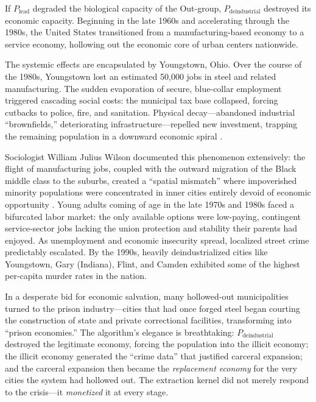 \documentclass[12pt,openany]{book}
\begin{document}
If $P_{\text{lead}}$ degraded the biological capacity of the Out-group, $P_{\text{deindustrial}}$ destroyed its economic capacity. Beginning in the late 1960s and accelerating through the 1980s, the United States transitioned from a manufacturing-based economy to a service economy, hollowing out the economic core of urban centers nationwide.

The systemic effects are encapsulated by Youngstown, Ohio. Over the course of the 1980s, Youngstown lost an estimated 50,000 jobs in steel and related manufacturing. The sudden evaporation of secure, blue-collar employment triggered cascading social costs: the municipal tax base collapsed, forcing cutbacks to police, fire, and sanitation. Physical decay---abandoned industrial ``brownfields,'' deteriorating infrastructure---repelled new investment, trapping the remaining population in a downward economic spiral \cite{wilson_wj}.

Sociologist William Julius Wilson documented this phenomenon extensively: the flight of manufacturing jobs, coupled with the outward migration of the Black middle class to the suburbs, created a ``spatial mismatch'' where impoverished minority populations were concentrated in inner cities entirely devoid of economic opportunity \cite{wilson_wj}. Young adults coming of age in the late 1970s and 1980s faced a bifurcated labor market: the only available options were low-paying, contingent service-sector jobs lacking the union protection and stability their parents had enjoyed. As unemployment and economic insecurity spread, localized street crime predictably escalated. By the 1990s, heavily deindustrialized cities like Youngstown, Gary (Indiana), Flint, and Camden exhibited some of the highest per-capita murder rates in the nation.

In a desperate bid for economic salvation, many hollowed-out municipalities turned to the prison industry---cities that had once forged steel began courting the construction of state and private correctional facilities, transforming into ``prison economies.'' The algorithm's elegance is breathtaking: $P_{\text{deindustrial}}$ destroyed the legitimate economy, forcing the population into the illicit economy; the illicit economy generated the ``crime data'' that justified carceral expansion; and the carceral expansion then became the \textit{replacement economy} for the very cities the system had hollowed out. The extraction kernel did not merely respond to the crisis---it \textit{monetized} it at every stage.
\end{document}
